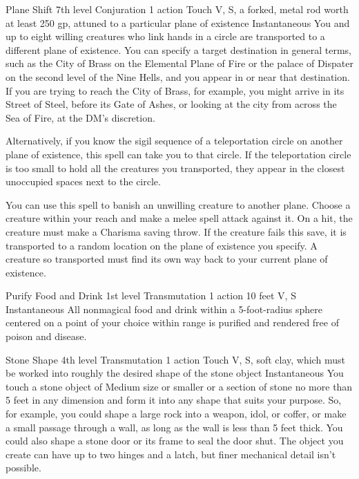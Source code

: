 \documentclass[10pt,a4paper,twoside,bg=print,twocolumn,openany,nodeprecatedcode]{dndbook}
\begin{document}


\DndSpellHeader%
{Plane Shift}
{7th level Conjuration}
{1 action}
{Touch}
{V, S, a forked, metal rod worth at least 250 gp, attuned to a particular plane of existence}
{Instantaneous}
You and up to eight willing creatures who link hands in a circle are transported to a different plane of existence. You can specify a target destination in general terms, such as the City of Brass on the Elemental Plane of Fire or the palace of Dispater on the second level of the Nine Hells, and you appear in or near that destination. If you are trying to reach the City of Brass, for example, you might arrive in its Street of Steel, before its Gate of Ashes, or looking at the city from across the Sea of Fire, at the DM's discretion.

Alternatively, if you know the sigil sequence of a teleportation circle on another plane of existence, this spell can take you to that circle. If the teleportation circle is too small to hold all the creatures you transported, they appear in the closest unoccupied spaces next to the circle.

You can use this spell to banish an unwilling creature to another plane. Choose a creature within your reach and make a melee spell attack against it. On a hit, the creature must make a Charisma saving throw. If the creature fails this save, it is transported to a random location on the plane of existence you specify. A creature so transported must find its own way back to your current plane of existence.



\DndSpellHeader%
{Purify Food and Drink}
{1st level Transmutation}
{1 action}
{10 feet}
{V, S}
{Instantaneous}
All nonmagical food and drink within a 5-foot-radius sphere centered on a point of your choice within range is purified and rendered free of poison and disease.



\DndSpellHeader%
{Stone Shape}
{4th level Transmutation}
{1 action}
{Touch}
{V, S, soft clay, which must be worked into roughly the desired shape of the stone object}
{Instantaneous}
You touch a stone object of Medium size or smaller or a section of stone no more than 5 feet in any dimension and form it into any shape that suits your purpose. So, for example, you could shape a large rock into a weapon, idol, or coffer, or make a small passage through a wall, as long as the wall is less than 5 feet thick. You could also shape a stone door or its frame to seal the door shut. The object you create can have up to two hinges and a latch, but finer mechanical detail isn't possible.
\end{document}
